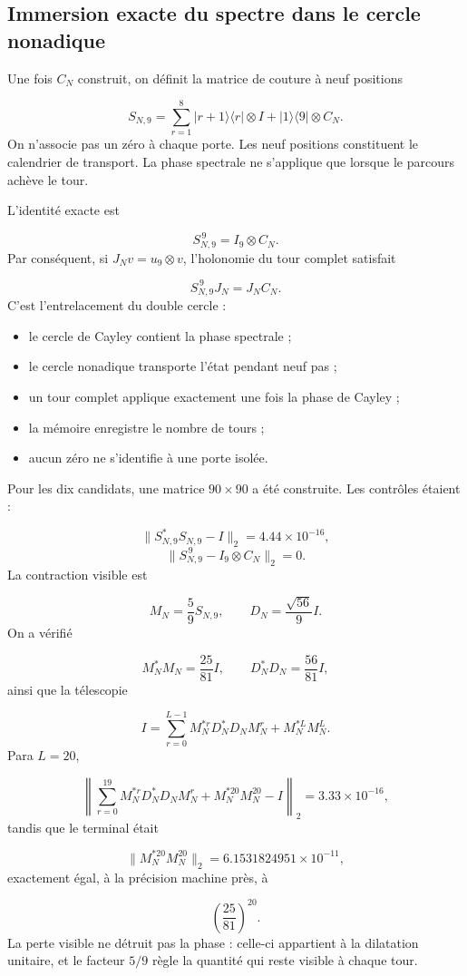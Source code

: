 \subsection{Immersion exacte du spectre dans le cercle nonadique}
Une fois \(C_N\) construit, on définit la matrice de couture à neuf positions\par
\[
S_{N,9}
=
\sum_{r=1}^{8}
|r+1\rangle\langle r|\otimes I
+
|1\rangle\langle9|\otimes C_N.
\]
On n'associe pas un zéro à chaque porte. Les neuf positions constituent le calendrier de transport. La phase spectrale ne s'applique que lorsque le parcours achève le tour.\par
L'identité exacte est\par
\[
S_{N,9}^{\,9}=I_9\otimes C_N.
\]
Par conséquent, si \(J_Nv=u_9\otimes v\), l'holonomie du tour complet satisfait\par
\[
S_{N,9}^{\,9}J_N=J_NC_N.
\]
C'est l'entrelacement du double cercle :\par
\begin{itemize}
\item le cercle de Cayley contient la phase spectrale ;
\item le cercle nonadique transporte l'état pendant neuf pas ;
\item un tour complet applique exactement une fois la phase de Cayley ;
\item la mémoire enregistre le nombre de tours ;
\item aucun zéro ne s'identifie à une porte isolée.
\end{itemize}
Pour les dix candidats, une matrice \(90\times90\) a été construite. Les contrôles étaient :\par
\[
\|S_{N,9}^*S_{N,9}-I\|_2
=
4.44\times10^{-16},
\]
\[
\|S_{N,9}^{\,9}-I_9\otimes C_N\|_2=0.
\]
La contraction visible est\par
\[
M_N=\frac59S_{N,9},
\qquad
D_N=\frac{\sqrt{56}}9I.
\]
On a vérifié\par
\[
M_N^*M_N=\frac{25}{81}I,
\qquad
D_N^*D_N=\frac{56}{81}I,
\]
ainsi que la télescopie\par
\[
I=
\sum_{r=0}^{L-1}
M_N^{*r}D_N^*D_NM_N^r
+
M_N^{*L}M_N^L.
\]
Para \(L=20\),\par
\[
\left\|
\sum_{r=0}^{19}M_N^{*r}D_N^*D_NM_N^r
+
M_N^{*20}M_N^{20}
-I
\right\|_2
=
3.33\times10^{-16},
\]
tandis que le terminal était\par
\[
\|M_N^{*20}M_N^{20}\|_2
=
6.1531824951\times10^{-11},
\]
exactement égal, à la précision machine près, à\par
\[
\left(\frac{25}{81}\right)^{20}.
\]
La perte visible ne détruit pas la phase : celle-ci appartient à la dilatation unitaire, et le facteur \(5/9\) règle la quantité qui reste visible à chaque tour.\par
{}
